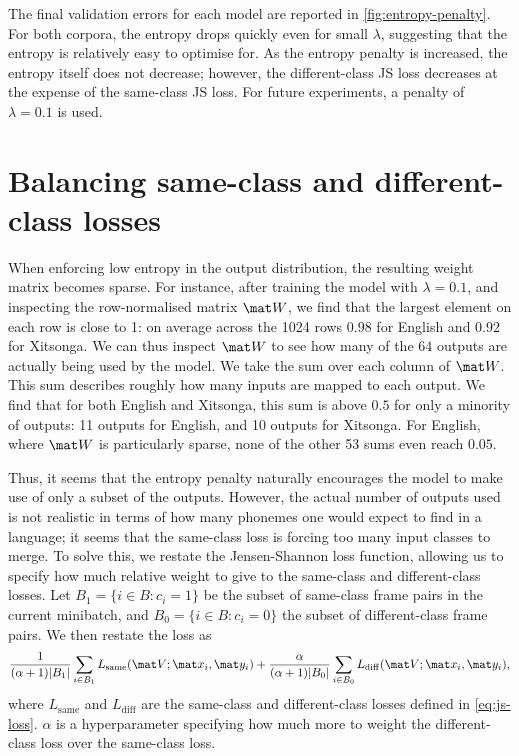 The final validation errors for each model are reported in \cref{fig:entropy-penalty}.
For both corpora, the entropy drops quickly even for small $\lambda$, suggesting that the entropy is relatively easy to optimise for.
As the entropy penalty is increased, the entropy itself does not decrease; however, the different-class JS loss decreases at the expense of the same-class JS loss. 
For future experiments, a penalty of $\lambda = 0.1$ is used.

\section{Balancing same-class and different-class losses}
When enforcing low entropy in the output distribution, the resulting weight matrix becomes sparse.
For instance, after training the model with $\lambda = 0.1$, and inspecting the row-normalised matrix $\mat W$, we find that the largest element on each row is close to 1: on average across the 1024 rows $0.98$ for English and $0.92$ for Xitsonga.
We can thus inspect $\mat W$ to see how many of the $64$ outputs are actually being used by the model.
We take the sum over each column of $\mat W$.
This sum describes roughly how many inputs are mapped to each output.
We find that for both English and Xitsonga, this sum is above $0.5$ for only a minority of outputs: 11 outputs for English, and 10 outputs for Xitsonga.
For English, where $\mat W$ is particularly sparse, none of the other 53 sums even reach $0.05$.

Thus, it seems that the entropy penalty naturally encourages the model to make use of only a subset of the outputs.
However, the actual number of outputs used is not realistic in terms of how many phonemes one would expect to find in a language; it seems that the same-class loss is forcing too many input classes to merge.
To solve this, we restate the Jensen-Shannon loss function, allowing us to specify how much relative weight to give to the same-class and different-class losses.
Let $B_1 = \{i \in B : c_i = 1\}$ be the subset of same-class frame pairs in the current minibatch, and $B_0 = \{i \in B : c_i = 0\}$ the subset of different-class frame pairs.
We then restate the loss as
\begin{equation}
  \frac{1}{(\alpha + 1)|B_1|} \sum_{i \in B_1} L_{\mathrm{same}}(\mat V; \mat x_i, \mat y_i) + \frac{\alpha}{(\alpha + 1)|B_0|} \sum_{i \in B_0} L_{\mathrm{diff}}(\mat V; \mat x_i, \mat y_i),
\end{equation}
where $L_{\mathrm{same}}$ and $L_{\mathrm{diff}}$ are the same-class and different-class losses defined in \cref{eq:js-loss}.
$\alpha$ is a hyperparameter specifying how much more to weight the different-class loss over the same-class loss.

